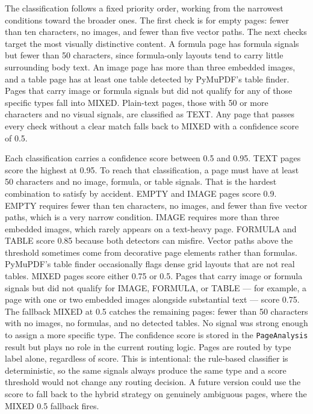 The classification follows a fixed priority order, working from the narrowest
conditions toward the broader ones. The first check is for empty pages: fewer
than ten characters, no images, and fewer than five vector paths. The next
checks target the most visually distinctive content. A formula page has formula
signals but fewer than 50 characters, since formula-only layouts tend to carry
little surrounding body text. An image page has more than three embedded images,
and a table page has at least one table detected by PyMuPDF's table finder.
Pages that carry image or formula signals but did not qualify for any of those
specific types fall into MIXED. Plain-text pages, those with 50 or more
characters and no visual signals, are classified as TEXT. Any page that passes
every check without a clear match falls back to MIXED with a confidence score
of 0.5.

Each classification carries a confidence score between 0.5 and 0.95.
TEXT pages score the highest at 0.95. To reach that classification, a page must have at least 50 characters and no image, formula, or table signals. That is the hardest combination to satisfy by accident.
EMPTY and IMAGE pages score 0.9. EMPTY requires fewer than ten characters, no images, and fewer than five vector paths, which is a very narrow condition. IMAGE requires more than three embedded images, which rarely appears on a text-heavy page.
FORMULA and TABLE score 0.85 because both detectors can misfire. Vector paths above the threshold sometimes come from decorative page elements rather than formulas. PyMuPDF's table finder occasionally flags dense grid layouts that are not real tables.
MIXED pages score either 0.75 or 0.5. Pages that carry image or formula signals but did not qualify for IMAGE, FORMULA, or TABLE --- for example, a page with one or two embedded images alongside substantial text --- score 0.75. The fallback MIXED at 0.5 catches the remaining pages: fewer than 50 characters with no images, no formulas, and no detected tables. No signal was strong enough to assign a more specific type.
The confidence score is stored in the \texttt{PageAnalysis} result but plays no role in the current routing logic. Pages are routed by type label alone, regardless of score. This is intentional: the rule-based classifier is deterministic, so the same signals always produce the same type and a score threshold would not change any routing decision. A future version could use the score to fall back to the hybrid strategy on genuinely ambiguous pages, where the MIXED 0.5 fallback fires.

